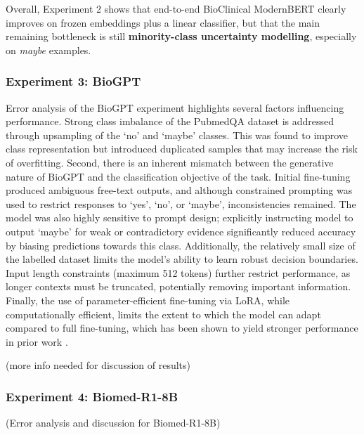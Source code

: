 \documentclass[11pt]{article}
\begin{document}
Overall, Experiment 2 shows that end-to-end BioClinical ModernBERT clearly improves on frozen embeddings plus a linear classifier, but that the main remaining bottleneck is still \textbf{minority-class uncertainty modelling}, especially on \textit{maybe} examples.

\subsubsection{Experiment 3: BioGPT}
Error analysis of the BioGPT experiment highlights several factors influencing performance. Strong class imbalance of the PubmedQA dataset is addressed through upsampling of the ‘no’ and ‘maybe’ classes. This was found to improve class representation but introduced duplicated samples that may increase the risk of overfitting. Second, there is an inherent mismatch between the generative nature of BioGPT and the classification objective of the task. Initial fine-tuning produced ambiguous free-text outputs, and although constrained prompting was used to restrict responses to ‘yes’, ‘no’, or ‘maybe’, inconsistencies remained. The model was also highly sensitive to prompt design; explicitly instructing model to output ‘maybe’ for weak or contradictory evidence significantly reduced accuracy by biasing predictions towards this class. Additionally, the relatively small size of the labelled dataset limits the model’s ability to learn robust decision boundaries. Input length constraints (maximum 512 tokens) further restrict performance, as longer contexts must be truncated, potentially removing important information. Finally, the use of parameter-efficient fine-tuning via LoRA, while computationally efficient, limits the extent to which the model can adapt compared to full fine-tuning, which has been shown to yield stronger performance in prior work \cite{luo_biogpt_2022}. \par
(more info needed for discussion of results)
\subsubsection{Experiment 4: Biomed-R1-8B}
(Error analysis and discussion for Biomed-R1-8B)
\end{document}
